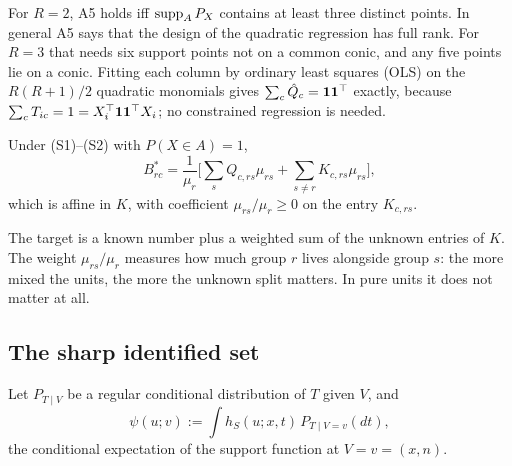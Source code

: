 \begin{remark}[A5 in practice]\label{rem:A5}
For $R=2$, A5 holds iff $\operatorname{supp}_AP_X$ contains at least three distinct points. In
general A5 says that the design of the quadratic regression has full rank. For
$R=3$ that needs six support points not on a common conic, and any five points
lie on a conic. Fitting each column by ordinary least squares (OLS) on the
$R(R+1)/2$ quadratic monomials gives $\sum_c\hat Q_c=\mathbf 1\mathbf 1^\top$ exactly,
because $\sum_cT_{ic}=1=X_i^\top\mathbf 1\mathbf 1^\top X_i$; no constrained regression is
needed.
\end{remark}

\begin{lemma}\label{lem:estimand}
Under (S1)--(S2) with $P(X\in A)=1$,
\[
B^*_{rc}=\frac1{\mu_r}\Big[\sum_sQ_{c,rs}\mu_{rs}+\sum_{s\ne r}K_{c,rs}\mu_{rs}\Big],
\]
which is affine in $K$, with coefficient $\mu_{rs}/\mu_r\ge0$ on the entry $K_{c,rs}$.
\end{lemma}
\begin{reading}
The target is a known number plus a weighted sum of the unknown entries of $K$.
The weight $\mu_{rs}/\mu_r$ measures how much group $r$ lives alongside group
$s$: the more mixed the units, the more the unknown split matters. In pure
units it does not matter at all.
\end{reading}

\subsection{The sharp identified set}

Let $P_{T\mid V}$ be a regular conditional distribution of $T$ given $V$, and
\[
\psi(u;v):=\int h_S(u;x,t)\,P_{T\mid V=v}(dt),
\]
the conditional expectation of the support function at $V=v=(x,n)$.

